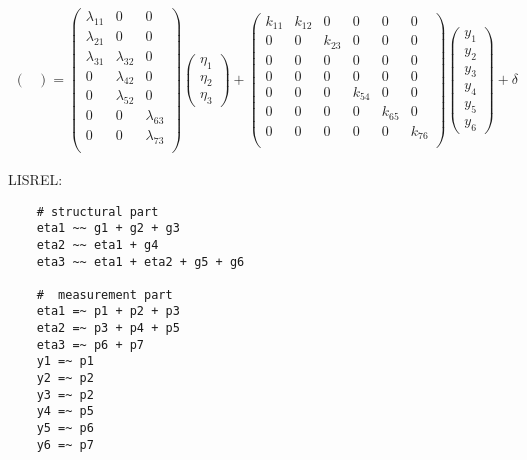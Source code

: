 \documentclass[a4paper,12pt]{article}
\begin{document}
\begin{gather*}
\begin{pmatrix}
\end{pmatrix} =
\begin{pmatrix}
	\lambda_{11} & 0 & 0 \\
	\lambda_{21} & 0 & 0 \\
	\lambda_{31} & \lambda_{32} & 0 \\
	0 & \lambda_{42} & 0 \\
	0 & \lambda_{52} & 0 \\
	0 & 0 & \lambda_{63} \\
	0 & 0 & \lambda_{73} \\
\end{pmatrix}
\begin{pmatrix}
	\eta_1 \\
	\eta_2 \\
	\eta_3
\end{pmatrix} +
\begin{pmatrix}
	k_{11} & k_{12} & 0 & 0 & 0 & 0 \\
	0 & 0 & k_{23} & 0 & 0 & 0 \\
	0 & 0 & 0 & 0 & 0 & 0 \\
	0 & 0 & 0 & 0 & 0 & 0 \\
	0 & 0 & 0 & k_{54} & 0 & 0 \\
	0 & 0 & 0 & 0 & k_{65} & 0 \\
	0 & 0 & 0 & 0 & 0 & k_{76} \\
\end{pmatrix}
\begin{pmatrix}
	y_1 \\ y_2 \\ y_3 \\ y_4 \\ y_5 \\ y_6
\end{pmatrix} + \delta
\end{gather*}


LISREL:

\begin{verbatim}
	# structural part
	eta1 ~~ g1 + g2 + g3
	eta2 ~~ eta1 + g4
	eta3 ~~ eta1 + eta2 + g5 + g6

	#  measurement part
	eta1 =~ p1 + p2 + p3
	eta2 =~ p3 + p4 + p5
	eta3 =~ p6 + p7
	y1 =~ p1
	y2 =~ p2
	y3 =~ p2
	y4 =~ p5
	y5 =~ p6
	y6 =~ p7
\end{verbatim}
\end{document}
